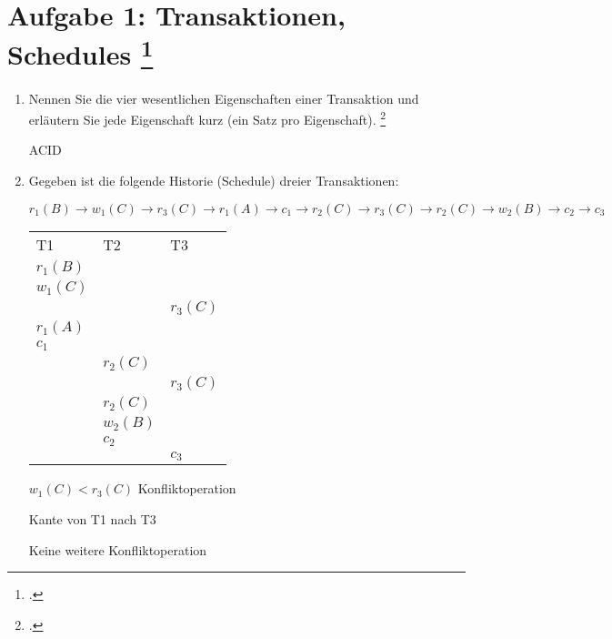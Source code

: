 \documentclass{lehramt-informatik-aufgabe}
\begin{document}

\section{Aufgabe 1: Transaktionen, Schedules
\footcite{db:pu:5}}

\begin{enumerate}

\item Nennen Sie die vier wesentlichen Eigenschaften einer
Transaktion und erläutern Sie jede Eigenschaft kurz (ein Satz pro
Eigenschaft).
\footcite[Thema 1 Teilaufgabe 1 Aufgabe 5]{examen:46116:2016:03}

\begin{liAntwort}
ACID
\end{liAntwort}

\item Gegeben ist die folgende Historie (Schedule) dreier Transaktionen:

$
r_1 (B) \rightarrow
w_1 (C) \rightarrow
r_3 (C) \rightarrow
r_1 (A) \rightarrow
c_1 \rightarrow
r_2 (C) \rightarrow
r_3 (C) \rightarrow
r_2 (C) \rightarrow
w_2 (B) \rightarrow
c_2 \rightarrow
c_3
$

\begin{liAntwort}
\begin{tabular}{lll}
T1 & T2 & T3 \\
$r_1 (B)$ &           &           \\
$w_1 (C)$ &           &           \\
          &           & $r_3 (C)$ \\
$r_1 (A)$ &           &           \\
$c_1$     &           &           \\
          & $r_2 (C)$ &           \\
          &           & $r_3 (C)$ \\
          & $r_2 (C)$ &           \\
          & $w_2 (B)$ &           \\
          & $c_2$     &           \\
          &           & $c_3$     \\
\end{tabular}

$w_1 (C) < r_3 (C)$ Konfliktoperation

Kante von T1 nach T3

Keine weitere Konfliktoperation


\end{liAntwort}
\end{enumerate}
\end{document}

